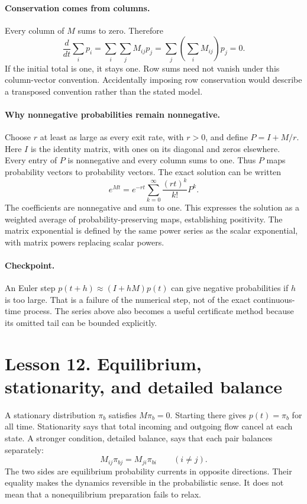 \documentclass[11pt]{article}
\begin{document}
\paragraph{Conservation comes from columns.}
Every column of $M$ sums to zero. Therefore
\[
\frac{d}{dt}\sum_i p_i
=\sum_i\sum_jM_{ij}p_j
=\sum_j\left(\sum_iM_{ij}\right)p_j=0.
\]
If the initial total is one, it stays one. Row sums need not vanish under
this column-vector convention. Accidentally imposing row conservation
would describe a transposed convention rather than the stated model.

\paragraph{Why nonnegative probabilities remain nonnegative.}
Choose $r$ at least as large as every exit rate, with $r>0$, and define
$P=I+M/r$. Here $I$ is the identity matrix, with ones on its diagonal and
zeros elsewhere. Every entry of $P$ is nonnegative and every column sums
to one. Thus $P$ maps probability vectors to probability vectors. The exact
solution can be written
\[
e^{Mt}=e^{-rt}\sum_{k=0}^{\infty}\frac{(rt)^k}{k!}P^k.
\]
The coefficients are nonnegative and sum to one. This expresses the solution
as a weighted average of probability-preserving maps, establishing positivity.
The matrix exponential is defined by the same power series as the scalar
exponential, with matrix powers replacing scalar powers.

\paragraph{Checkpoint.}
An Euler step $p(t+h)\approx(I+hM)p(t)$ can give negative probabilities if
$h$ is too large. That is a failure of the numerical step, not of the exact
continuous-time process. The series above also becomes a useful certificate
method because its omitted tail can be bounded explicitly.

\clearpage
\section*{Lesson 12. Equilibrium, stationarity, and detailed balance}
A stationary distribution $\pi_b$ satisfies $M\pi_b=0$. Starting there gives
$p(t)=\pi_b$ for all time. Stationarity says that total incoming and outgoing
flow cancel at each state. A stronger condition, detailed balance, says that
each pair balances separately:
\[
M_{ij}\pi_{bj}=M_{ji}\pi_{bi}\qquad(i\ne j).
\]
The two sides are equilibrium probability currents in opposite directions.
Their equality makes the dynamics reversible in the probabilistic sense.
It does not mean that a nonequilibrium preparation fails to relax.
\end{document}
